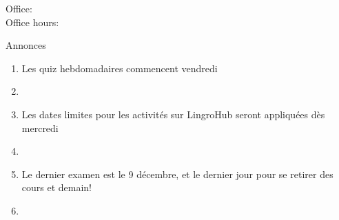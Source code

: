 \documentclass{beamer}
\subtitle[À la fac, articles, lettres]{À la fac, les articles et les lettres}
\begin{document}
  \begin{frame}
    \titlepage
    \tiny{Office: \\
          Office hours: }
  \end{frame}

  \begin{frame}{Annonces }
    \begin{enumerate}
      \item Les quiz hebdomadaires commencent vendredi
      \item[] 
      \item Les dates limites pour les activités sur LingroHub seront appliquées dès mercredi
      \item[] 
      \item Le dernier examen est le 9 décembre, et le dernier jour pour se retirer des cours et demain!
      \item[] 
    \end{enumerate}
  \end{frame}

\end{document}
